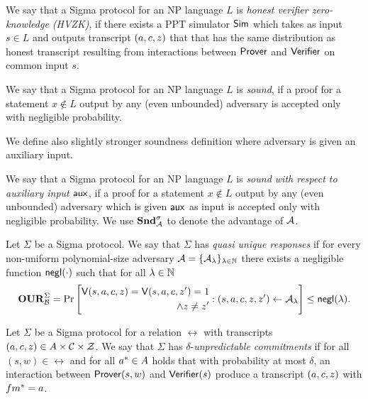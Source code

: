 \begin{definition}
We say that a Sigma protocol for an NP language  $L$ is \emph{honest verifier zero-knowledge (HVZK)}, if there exists a PPT simulator $\mathsf{Sim}$ which takes as input $s \in L$ and outputs transcript $(a,c,z)$ that that has the same distribution as honest
transcript resulting from interactions between $\mathsf{Prover}$ and $\mathsf{Verifier}$ on common input $s$.
\end{definition}

\begin{definition}[Soundness]
We say that a Sigma protocol for an NP language $L$ is \emph{sound}, if a proof for a statement $x \notin L$ output by any (even unbounded) adversary is accepted only with negligible probability.
\end{definition}
We define also slightly stronger soundness definition where adversary is given an auxiliary input.
\begin{definition}\label{def:nizk-snd-aux}
We say that a Sigma protocol for an NP language $L$ is \emph{sound with respect to auxiliary input $\mathsf{aux}$}, if a proof for a statement $x \notin L$ output by any (even unbounded) adversary which is given $\mathsf{aux}$ as input is accepted only with negligible probability. We use $\mathbf{Snd}^\sigma_{\mathcal{A}}$ to denote the advantage of $\mathcal{A}$.
\end{definition}

\begin{definition}
Let $\Sigma$ be a Sigma protocol. We say that $\Sigma$ has \emph{quasi unique responses} if for every non-uniform polynomial-size adversary $\mathcal{A} = \{\mathcal{A}_{\lambda}\}_{\lambda \in \mathbb{N}}$ there exists a negligible function $\mathsf{negl}(\cdot)$ such that for all $\lambda \in \mathbb{N}$ 
\[\mathbf{OUR}^\Sigma_{\mathcal{B}} = \Pr\left[ 
\begin{aligned}
\mathsf{V}(s,a,c,z) = \mathsf{V}(s,a,c,z' ) = 1 \\
 \land z \neq z' 
\end{aligned}
:(s, a, c , z, z')\leftarrow \mathcal{A}_{\lambda} \right] \leq \mathsf{negl}(\lambda).\]
\end{definition}

\begin{definition}
Let $\Sigma$ be a Sigma protocol for a relation $\rel$ with transcripts $(a,c,z) \in A \times \mathcal{C} \times \mathcal{Z}$. We say that $\Sigma$ has $\delta$-\emph{unpredictable commitments} if for all $(s,w) \in \rel$ and for all $a^* \in A$ holds that with probability at most $\delta$, an interaction between $\mathsf{Prover}(s,w)$ and $\mathsf{Verifier}(s)$ produce a transcript $(a,c,z)$ with $fm^*= a$.
\end{definition}

